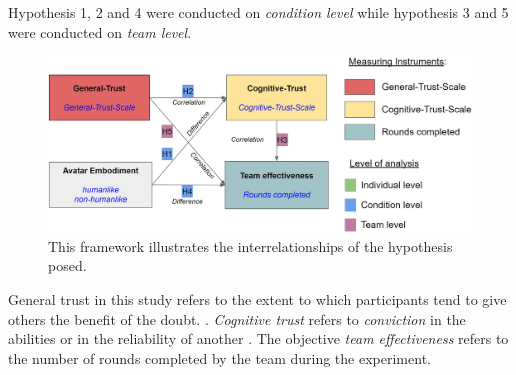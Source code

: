 \documentclass[sigchi]{acmart}
\begin{document}
Hypothesis 1, 2 and 4 were conducted on \textit{condition level} while hypothesis 3 and 5 were conducted on \textit{team level}.
\begin{figure}[H]
		\begin{footnotesize}
			\includegraphics[width=\linewidth]{Abbildungen/Versuchshypothesen_02.JPG}		
			\caption[The self-constructed framework of experimental hypotheses]{This framework illustrates the interrelationships of the hypothesis posed.}
			\label{Versuchshypothesen}
		\end{footnotesize}
	\end{figure}	

General trust in this study refers to the extent to which participants tend to give others the benefit of the doubt. \citep{mcallister1995affect}.
\textit{Cognitive trust} refers to \textit{conviction} in the abilities or in the reliability of another \citep{mcallister1995affect}.
The objective \textit{team effectiveness} refers to the number of rounds completed by the team during the experiment.
\end{document}
